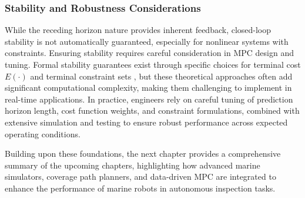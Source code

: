 \subsubsection{Stability and Robustness Considerations}

While the receding horizon nature provides inherent feedback, closed-loop stability is not automatically guaranteed, especially for nonlinear systems with constraints. Ensuring stability requires careful consideration in MPC design and tuning. Formal stability guarantees exist through specific choices for terminal cost $E(\cdot)$ and terminal constraint sets \cite{hao2017nonlinear}, but these theoretical approaches often add significant computational complexity, making them challenging to implement in real-time applications. In practice, engineers rely on careful tuning of prediction horizon length, cost function weights, and constraint formulations, combined with extensive simulation and testing to ensure robust performance across expected operating conditions.


Building upon these foundations, the next chapter provides a comprehensive summary of the upcoming chapters, highlighting how advanced marine simulators, coverage path planners, and data-driven MPC are integrated to enhance the performance of marine robots in autonomous inspection tasks.